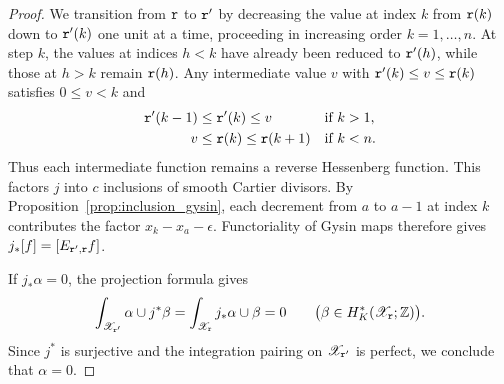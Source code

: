 \begin{proof}
We transition from $\mathtt r$ to $\mathtt r'$ by decreasing the value at index $k$ from $\mathtt r(k)$ down to $\mathtt r'(k)$ one unit at a time, proceeding in increasing order $k=1,\dots,n$.
At step $k$, the values at indices $h<k$ have already been reduced to $\mathtt r'(h)$,
while those at $h>k$ remain $\mathtt r(h)$.
Any intermediate value $v$ with $\mathtt r'(k)\leq v\leq\mathtt r(k)$ satisfies $0\leq v<k$ and
\[
 \begin{aligned}
  \mathtt r'(k-1)&\leq\mathtt r'(k)\leq v &&\text{if }k>1,\\
  v&\leq\mathtt r(k)\leq\mathtt r(k+1) &&\text{if }k<n.
 \end{aligned}
\]
Thus each intermediate function remains a reverse Hessenberg function.
This factors $j$ into $c$ inclusions of smooth Cartier divisors.
By Proposition~\ref{prop:inclusion_gysin}, each decrement from $a$ to $a-1$
at index $k$ contributes the factor $x_k-x_a-\epsilon$.
Functoriality of Gysin maps therefore gives $j_*[f]=[E_{\mathtt r',\mathtt r}f]$.

If $j_*\alpha=0$, the projection formula gives
\[
 \int_{\mathscr X_{\mathtt r'}}\alpha\cup j^*\beta
 =\int_{\mathscr X_{\mathtt r}}j_*\alpha\cup\beta=0
 \qquad\bigl(\beta\in H_K^*(\mathscr X_{\mathtt r};\mathbb Z)\bigr).
\]
Since $j^*$ is surjective and the integration pairing on $\mathscr X_{\mathtt r'}$
is perfect, we conclude that $\alpha=0$.
\end{proof}
